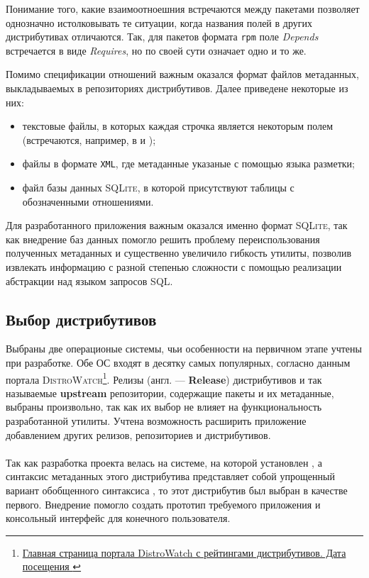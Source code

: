 Понимание того, какие взаимоотноешния встречаются между пакетами позволяет однозначно истолковывать те ситуации, когда названия полей в других дистрибутивах отличаются.
Так, для пакетов формата \texttt{rpm} поле \textit{Depends} встречается в виде \textit{Requires}, но по своей сути означает одно и то же.

Помимо спецификации отношений важным оказался формат файлов метаданных, выкладываемых в репозиториях дистрибутивов.
Далее приведене некоторые из них:
\begin{itemize}
	\item текстовые файлы, в которых каждая строчка является некоторым полем (встречаются, например, в {\debian} и {\ubuntu});
	\item файлы в формате \texttt{XML}, где метаданные указаные с помощью языка разметки;
	\item файл базы данных \textsc{SQLite}, в которой присутствуют таблицы с обозначенными отношениями.
\end{itemize}

Для разработанного приложения важным оказался именно формат \textsc{SQLite}, так как внедрение баз данных помогло решить проблему переиспользования полученных метаданных и существенно увеличило гибкость утилиты, позволив извлекать информацию с разной степенью сложности с помощью реализации абстракции над языком запросов \textsc{SQL}.

\subsection{Выбор дистрибутивов}
Выбраны две операционые системы, чьи особенности на первичном этапе учтены при разработке.
Обе ОС входят в десятку самых популярных, согласно данным портала \textsc{DistroWatch}\footnote{\href{https://distrowatch.com/}{Главная страница портала DistroWatch с рейтингами дистрибутивов. Дата посещения }}.
Релизы (англ. --- \textbf{Release}) дистрибутивов и так называемые \textbf{upstream} репозитории, содержащие пакеты и их метаданные, выбраны произвольно, так как их выбор не влияет на функциональность разработанной утилиты.
Учтена возможность расширить приложение добавлением других релизов, репозиториев и дистрибутивов.

\paragraph{\ubuntu}
Так как разработка проекта велась на системе, на которой установлен {\ubuntu}, а синтаксис метаданных этого дистрибутива представляет собой упрощенный вариант обобщенного синтаксиса {\debian}, то этот дистрибутив был выбран в качестве первого.
Внедрение {\ubuntu} помогло создать прототип требуемого приложения и консольный интерфейс для конечного пользователя.

